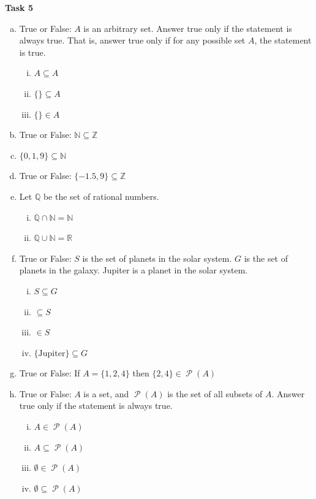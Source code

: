 \documentclass[12pt,letterpaper]{article}
\newcommand\N{\mathbb N}
\newcommand\Z{\mathbb Z}
\newcommand\R{\mathbb R}
\newcommand\Pow{\ensuremath{\operatorname{\mathcal{P}}}}
\begin{document}
    \textbf{Task 5}
      \begin{enumerate}[a.]
        \item True or False: $A$ is an arbitrary set. Answer true only if the statement is always true. That is, answer true only if for any possible set $A$, the statement is true. 
          \begin{enumerate}[i.]
            \item $A \subseteq A$
            \item $\{\} \subseteq A$
            \item $\{\} \in A$
		 \end{enumerate}
        \item True or False:  $\N \subseteq \Z$
        \item $\{0, 1, 9\} \subseteq \N$
        \item True or False: $\{-1.5, 9\} \subseteq \Z$
        
        \item Let $\mathbb{Q}$ be the set of rational numbers. 
        \begin{enumerate}[i.]
          \item $\mathbb{Q} \cap \N = \N$ 
          \item $\mathbb{Q} \cup \N = \R$
        \end{enumerate}
        
        \item True or False: $S$ is the set of planets in the solar system. $G$ is the set of planets in the galaxy. Jupiter is a planet in the solar system.
        \begin{enumerate}[i.]
          \item $S \subseteq G$
          \item {} $\subseteq S$
          \item {} $\in S$
          \item $\{\text{Jupiter}\} \subseteq G$
        \end{enumerate}
        
	    \item True or False: If $A = \{1,2,4\}$ then $\{2,4\} \in \Pow{(A)}$
	    
        \item True or False: $A$ is a set, and $\Pow{(A)}$ is the set of all subsets of $A$. Answer true only if the statement is always true.
		\begin{enumerate}[i.]
		   \item $A \in \Pow{(A)}$
		   \item $A \subseteq \Pow{(A)}$
		   \item $\emptyset \in \Pow{(A)}$
		   \item $\emptyset \subseteq \Pow{(A)}$
          \end{enumerate}
          

\end{enumerate}
\end{document}
